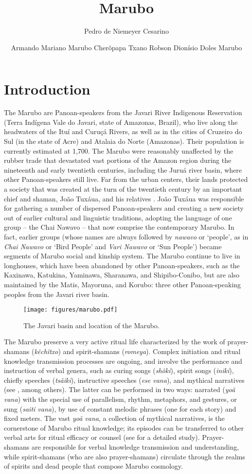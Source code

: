 \documentclass[output=paper,
modfonts,nonflat
]{langsci/langscibook}
\author{Pedro de Niemeyer Cesarino\affiliation{University of São Paulo, Brazil}%
\and Armando Mariano Marubo Cherõpapa Txano%
\lastand Robson Dionísio Doles Marubo%
}%
\title{Marubo}
\begin{document}
\section{Introduction}

The Marubo are Panoan-speakers from the Javari River Indigenous Reservation (Terra Indígena Vale do Javari, state of Amazonas, Brazil), who live along the headwaters of the Ituí and Curuçá Rivers, as well as in the cities of Cruzeiro do Sul (in the state of Acre) and Atalaia do Norte (Amazonas). Their population is currently estimated at 1,700. The Marubo were reasonably unaffected by the rubber trade that devastated vast portions of the Amazon region during the nineteenth and early twentieth centuries, including the Juruá river basin, where other Panoan-speakers still live. Far from the urban centers, their lands protected a society that was created at the turn of the twentieth century by an important chief and shaman, João Tuxáua, and his relatives \citep{Ruedas2001,Welper2009}. João Tuxáua was responsible for gathering a number of dispersed Panoan-speakers and creating a new society out of earlier cultural and linguistic traditions, adopting the language of one group -- the Chai Nawavo -- that now comprise the contemporary Marubo. In fact, earlier groups (whose names are always followed by \textit{nawavo} or `people', as in \textit{Chai Nawavo} or `Bird People' and \textit{Vari Nawavo} or `Sun People') became segments of Marubo social and kinship system. The Marubo continue to live in longhouses, which have been abandoned by other Panoan-speakers, such as the Kaxinawa, Katukina, Yaminawa, Sharanawa, and Shipibo-Conibo, but are also maintained by the Matis, Mayoruna, and Korubo: three other Panoan-speaking peoples from the Javari river basin.

\begin{figure}[H]
\texttt{[image: figures/marubo.pdf]}
  \caption{The Javari basin and location of the Marubo.}
\end{figure}

The Marubo preserve a very active ritual life characterized by the work of prayer-shamans (\textit{kẽchĩtxo}) and spirit-shamans (\textit{romeya}). Complex initiation and ritual knowledge transmission processes are ongoing, and involve the performance and instruction of verbal genera, such as curing songs (\textit{shõki}), spirit songs (\textit{iniki}), chiefly speeches (\textit{tsãiki}), instructive speeches (\textit{ese vana}), and mythical narratives (see \citealt{Montagner1985,Montagner1996,Cesarino2011,Cesarino2013}, among others). The latter can be performed in two ways: narrated (\textit{yoã vana}) with the special use of parallelism, rhythm, metaphors, and gestures, or sung (\textit{saiti vana}), by use of constant melodic phrases (one for each story) and fixed meters. The vast \textit{yoã vana}, a collection of mythical narratives, is the cornerstone of Marubo ritual knowledge; its episodes can be transferred to other verbal arts for ritual efficacy or counsel (see \citealt{Cesarino2011} for a detailed study). Prayer-shamans are responsible for verbal knowledge transmission and understanding, while spirit-shamans (who are also prayer-shamans) circulate through the realms of spirits and dead people that compose Marubo cosmology.
\end{document}
